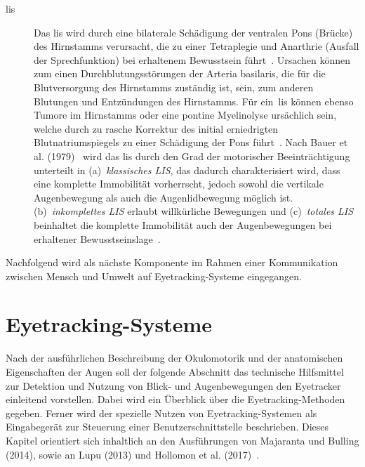 \begin{description}
\item[\acf{lis}] Das \acs{lis} wird durch eine bilaterale Schädigung der ventralen Pons (Brücke) des Hirnstamms verursacht, die zu einer Tetraplegie und Anarthrie (Ausfall der Sprechfunktion) bei erhaltenem Bewusstsein führt~\cite{Khanna201196}. Ursachen können zum einen Durchblutungsstörungen der Arteria basilaris, die für die Blutversorgung des Hirnstamms zuständig ist, sein, zum anderen Blutungen und Entzündungen des Hirnstamms. Für ein~\acs{lis} können ebenso Tumore im Hirnstamms oder eine pontine Myelinolyse ursächlich sein, welche durch zu rasche Korrektur des initial erniedrigten Blutnatriumspiegels zu einer Schädigung der Pons führt~\cite{steven2005}. Nach Bauer et al. (1979)~\cite{Bauer1979} wird das \acs{lis} durch den Grad der motorischer Beeinträchtigung unterteilt in (a)~\textit{klassisches LIS}, das dadurch charakterisiert wird, dass eine komplette Immobilität vorherrscht, jedoch sowohl die vertikale Augenbewegung als auch die Augenlidbewegung möglich ist. (b)~\textit{inkomplettes LIS} erlaubt willkürliche Bewegungen und (c)~\textit{totales LIS} beinhaltet die komplette Immobilität auch der Augenbewegungen bei erhaltener Bewusstseinslage~\cite{Khanna201196}.
\end{description}

Nachfolgend wird als nächste Komponente im Rahmen einer Kommunikation zwischen Mensch und Umwelt auf Eyetracking-Systeme eingegangen.

\section{Eyetracking-Systeme}
\label{section:eyetracker}

Nach der ausführlichen Beschreibung der Okulomotorik und der anatomischen Eigenschaften der Augen soll der folgende Abschnitt das technische Hilfsmittel zur Detektion und Nutzung von Blick- und Augenbewegungen den Eyetracker einleitend vorstellen. Dabei wird ein Überblick über die Eyetracking-Methoden gegeben. Ferner wird der spezielle Nutzen von Eyetracking-Systemen als Eingabegerät zur Steuerung einer Benutzerschnittstelle beschrieben. Dieses Kapitel orientiert sich inhaltlich an den Ausführungen von Majaranta und Bulling (2014), sowie an Lupu (2013) und Hollomon et al. (2017)~\cite{Lupu2013,Majaranta2014,Hollomon2017}. 

